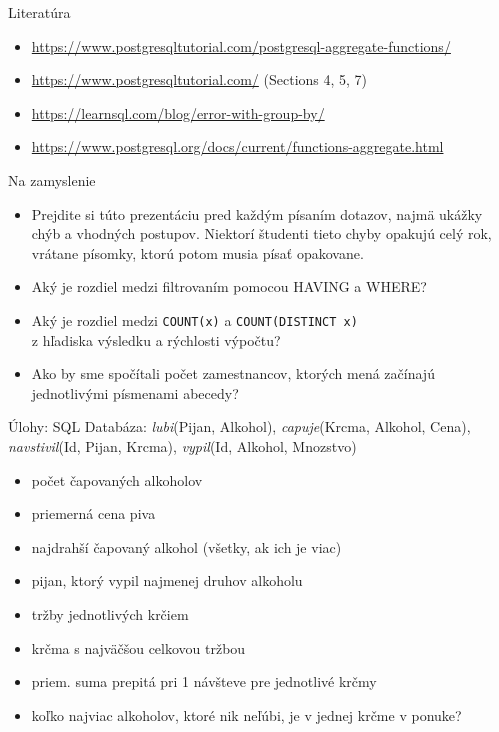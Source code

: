 \documentclass[12pt]{beamer}
\begin{document}
\begin{frame}{Literatúra}
\begin{itemize}
\item {\scriptsize\url{https://www.postgresqltutorial.com/postgresql-aggregate-functions/}}
\item {\scriptsize\url{https://www.postgresqltutorial.com/} (Sections 4, 5, 7)}
\item {\scriptsize\url{https://learnsql.com/blog/error-with-group-by/}}
\item {\scriptsize\url{https://www.postgresql.org/docs/current/functions-aggregate.html}}
\end{itemize}
\end{frame}


\begin{frame}[fragile]{Na zamyslenie}
\begin{itemize}
\item Prejdite si túto prezentáciu pred každým písaním dotazov, najmä ukážky chýb a vhodných postupov.
    Niektorí študenti tieto chyby opakujú celý rok, vrátane písomky, ktorú potom musia písať opakovane.
\item Aký je rozdiel medzi filtrovaním pomocou HAVING a WHERE?
\item Aký je rozdiel medzi \verb|COUNT(x)| a \verb|COUNT(DISTINCT x)|\\
    z hľadiska výsledku a rýchlosti výpočtu?
\item Ako by sme spočítali počet zamestnancov, ktorých mená začínajú jednotlivými písmenami abecedy?
\end{itemize}
\end{frame}


\begin{frame}{Úlohy: SQL}
Databáza: \emph{lubi}(Pijan, Alkohol), \emph{capuje}(Krcma, Alkohol, Cena),
\emph{navstivil}(Id, Pijan, Krcma), \emph{vypil}(Id, Alkohol, Mnozstvo)
\begin{itemize}
	\item počet čapovaných alkoholov
	\item priemerná cena piva
	\item najdrahší čapovaný alkohol (všetky, ak ich je viac)
    \item pijan, ktorý vypil najmenej druhov alkoholu
	\item tržby jednotlivých krčiem
    \item krčma s najväčšou celkovou tržbou
    \item priem. suma prepitá pri 1 návšteve pre jednotlivé krčmy
    \item koľko najviac alkoholov, ktoré nik neľúbi, je v jednej krčme v ponuke?
\end{itemize}
\end{frame}
\end{document}
